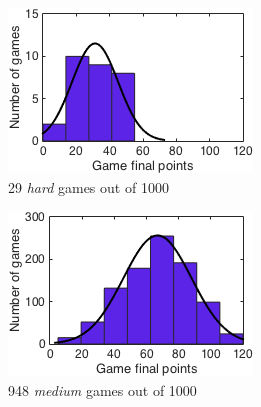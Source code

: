 \begin{figure}[h]
        \centering
        \begin{subfigure}[h]{0.32\textwidth}
                \includegraphics[width=\textwidth]{./img/appendix/histGhard}
                \caption{29 \emph{hard} games out of 1000}
                \label{app:histGhard}
        \end{subfigure}
        \begin{subfigure}[h]{0.32\textwidth}
                \includegraphics[width=\textwidth]{./img/appendix/histGmedium}
                \caption{948 \emph{medium} games out of 1000}
                \label{app:histGmedium}
        \end{subfigure}
        \begin{subfigure}[h]{0.32\textwidth}

\end{subfigure}
\end{figure}
